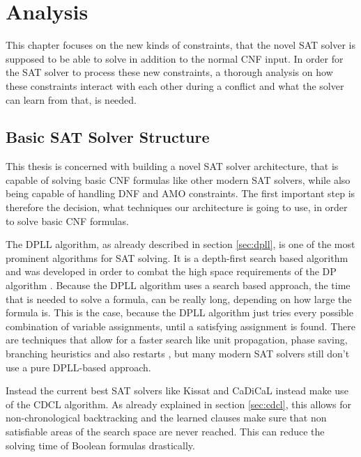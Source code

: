 \chapter{Analysis}
\label{ch:Analysis}

This chapter focuses on the new kinds of constraints, that the novel SAT solver is supposed to be able to solve in addition to the normal CNF input. In order for the SAT solver to process these new constraints, a thorough analysis on how these constraints interact with each other during a conflict and what the solver can learn from that, is needed.

\section{Basic SAT Solver Structure}

This thesis is concerned with building a novel SAT solver architecture, that is capable of solving basic CNF formulas like other modern SAT solvers, while also being capable of handling DNF and AMO constraints. The first important step is therefore the decision, what techniques our architecture is going to use, in order to solve basic CNF formulas.

The DPLL algorithm, as already described in section \ref{sec:dpll}, is one of the most prominent algorithms for SAT solving. It is a depth-first search based algorithm and was developed in order to combat the high space requirements of the DP algorithm \cite{biere2009handbook}. Because the DPLL algorithm uses a search based approach, the time that is needed to solve a formula, can be really long, depending on how large the formula is. This is the case, because the DPLL algorithm just tries every possible combination of variable assignments, until a satisfying assignment is found. There are techniques that allow for a faster search like unit propagation, phase saving, branching heuristics and also restarts \cite{biere2009handbook}, but many modern SAT solvers still don't use a pure DPLL-based approach.

Instead the current best SAT solvers like Kissat \cite{BiereFazekasFleuryHeisinger-SAT-Competition-2020-solvers} and CaDiCaL \cite{Biere-SAT-Competition-2017-solvers} instead make use of the CDCL algorithm. As already explained in section \ref{sec:cdcl}, this allows for non-chronological backtracking and the learned clauses make sure that non satisfiable areas of the search space are never reached. This can reduce the solving time of Boolean formulas drastically. 

